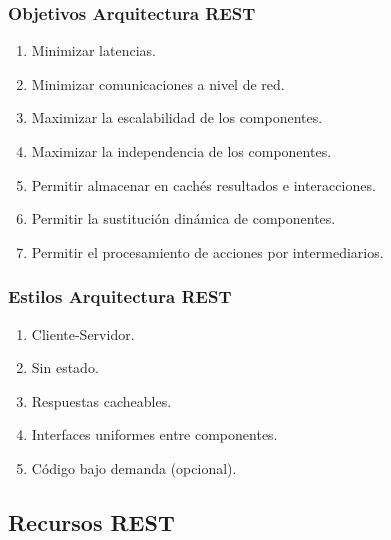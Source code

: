 \documentclass[a4paper,slidestop,blue]{beamer}
\begin{document}
\begin{frame}[c]
	\frametitle{Objetivos Arquitectura REST}
    \begin{enumerate}[<+->]
        \item Minimizar latencias.
        \item Minimizar comunicaciones a nivel de red.
        \item Maximizar la escalabilidad de los componentes.
        \item Maximizar la independencia de los componentes.
        \item Permitir almacenar en cachés resultados e interacciones.
        \item Permitir la sustitución dinámica de componentes.
        \item Permitir el procesamiento de acciones por intermediarios.
    \end{enumerate}
\end{frame}

\begin{frame}[c]
	\frametitle{Estilos Arquitectura REST}
    \begin{enumerate}[<+->]
        \item Cliente-Servidor.
        \item Sin estado.
        \item Respuestas cacheables.
        \item Interfaces uniformes entre componentes.
        \item Código bajo demanda (opcional).
    \end{enumerate}
\end{frame}

\subsection{Recursos REST}
\end{document}
